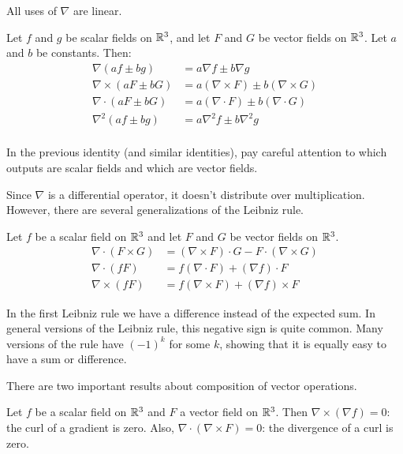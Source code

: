 \documentclass[fleqn,letterpaper]{report}
\begin{document}
All uses of $\nabla$ are linear.

\begin{prop}
Let $f$ and $g$ be scalar fields on $\mathbb{R}^3$, and let $F$ and
$G$ be vector fields on $\mathbb{R}^3$. Let $a$ and $b$ be
constants. Then:
\begin{align*}
\nabla (af \pm bg) & = a \nabla f \pm b \nabla g \\
\nabla \times (aF \pm bG) & = a (\nabla \times F) \pm b (\nabla
\times G) \\
\nabla \cdot (aF \pm bG) & = a (\nabla \cdot F) \pm b (\nabla
\cdot G) \\
\nabla^2 (af \pm bg) & = a \nabla^2 f \pm b \nabla^2 g \\
\end{align*}
\end{prop}

In the previous identity (and similar identities), pay careful
attention to which outputs are scalar fields and which are
vector fields.

Since $\nabla$ is a differential operator, it doesn't
distribute over multiplication. However, there are
several generalizations of the Leibniz rule.

\begin{prop}
Let $f$ be a scalar field on $\mathbb{R}^3$ and let $F$ and $G$ be
vector fields on $\mathbb{R}^3$. 
\begin{align*}
\nabla \cdot (F \times G) & = (\nabla \times F) \cdot G - F
\cdot (\nabla \times G) \\
\nabla \cdot (fF) & = f (\nabla \cdot F) + (\nabla f) \cdot F
\\
\nabla \times (fF) & = f (\nabla \times F) + (\nabla f) \times
F
\end{align*}
\end{prop}

In the first Leibniz rule we have a difference instead of the
expected sum. In general versions of the Leibniz rule, this
negative sign is quite common. Many versions of the rule have
$(-1)^k$ for some $k$, showing that it is equally easy to have
a sum or difference.

There are two important results about composition of vector
operations.

\begin{prop}
Let $f$ be a scalar field on $\mathbb{R}^3$ and $F$ a vector field on
$\mathbb{R}^3$. Then $\nabla \times (\nabla f) = 0$: the 
curl of a gradient is zero. Also, $\nabla \cdot (\nabla
\times F) = 0$: the divergence of a curl is zero.
\end{prop}
\end{document}
